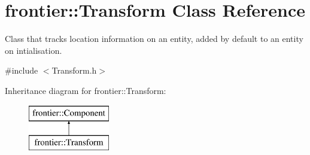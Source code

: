 \hypertarget{classfrontier_1_1_transform}{}\section{frontier\+:\+:Transform Class Reference}
\label{classfrontier_1_1_transform}


Class that tracks location information on an entity, added by default to an entity on intialisation.  




{\ttfamily \#include $<$Transform.\+h$>$}

Inheritance diagram for frontier\+:\+:Transform\+:\begin{figure}[H]
\begin{center}
\leavevmode
\includegraphics[height=2.000000cm]{classfrontier_1_1_transform}
\end{center}
\end{figure}

